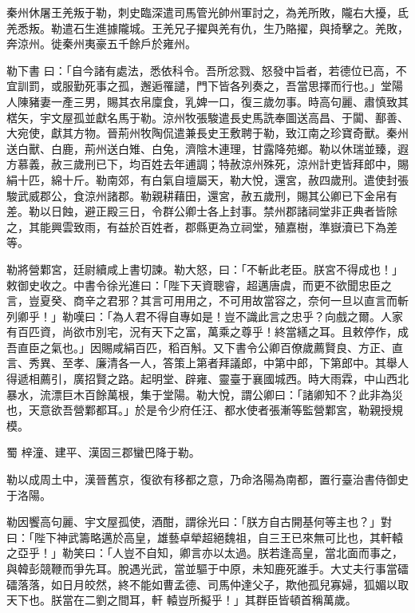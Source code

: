 \begin{pinyinscope}
 秦州休屠王羌叛于勒，刺史臨深遣司馬管光帥州軍討之，為羌所敗，隴右大擾，氐羌悉叛。勒遣石生進據隴城。王羌兄子擢與羌有仇，生乃賂擢，與掎擊之。羌敗，奔涼州。徙秦州夷豪五千餘戶於雍州。



 勒下書
 曰：「自今諸有處法，悉依科令。吾所忿戮、怒發中旨者，若德位已高，不宜訓罰，或服勤死事之孤，邂逅罹譴，門下皆各列奏之，吾當思擇而行也。」堂陽人陳豬妻一產三男，賜其衣帛廩食，乳婢一口，復三歲勿事。時高句麗、肅慎致其楛矢，宇文屋孤並獻名馬于勒。涼州牧張駿遣長史馬詵奉圖送高昌、于闐、鄯善、大宛使，獻其方物。晉荊州牧陶侃遣兼長史王敷聘于勒，致江南之珍寶奇獸。秦州送白獸、白鹿，荊州送白雉、白兔，濟陰木連理，甘露降苑鄉。勒以休瑞並臻，遐方慕義，赦三歲刑已下，均百姓去年逋調；特赦涼州殊死，涼州計吏皆拜郎中，賜
 絹十匹，綿十斤。勒南郊，有白氣自壇屬天，勒大悅，還宮，赦四歲刑。遣使封張駿武威郡公，食涼州諸郡。勒親耕藉田，還宮，赦五歲刑，賜其公卿已下金帛有差。勒以日蝕，避正殿三日，令群公卿士各上封事。禁州郡諸祠堂非正典者皆除之，其能興雲致雨，有益於百姓者，郡縣更為立祠堂，殖嘉樹，準嶽瀆已下為差等。



 勒將營鄴宮，廷尉續咸上書切諫。勒大怒，曰：「不斬此老臣。朕宮不得成也！」敕御史收之。中書令徐光進曰：「陛下天資聰睿，超邁唐虞，而更不欲聞忠臣之言，豈夏癸、商辛之君邪？其言可用用之，不可用故當容之，奈何一旦以直言而斬
 列卿乎！」勒嘆曰：「為人君不得自專如是！豈不識此言之忠乎？向戲之爾。人家有百匹資，尚欲市別宅，況有天下之富，萬乘之尊乎！終當繕之耳。且敕停作，成吾直臣之氣也。」因賜咸絹百匹，稻百斛。又下書令公卿百僚歲薦賢良、方正、直言、秀異、至孝、廉清各一人，答策上第者拜議郎，中第中郎，下第郎中。其舉人得遞相薦引，廣招賢之路。起明堂、辟雍、靈臺于襄國城西。時大雨霖，中山西北暴水，流漂巨木百餘萬根，集于堂陽。勒大悅，謂公卿曰：「諸卿知不？此非為災也，天意欲吾營鄴都耳。」於是令少府任汪、都水使者張漸等監營鄴宮，勒親授規模。



 蜀
 梓潼、建平、漢固三郡蠻巴降于勒。



 勒以成周土中，漢晉舊京，復欲有移都之意，乃命洛陽為南都，置行臺治書侍御史于洛陽。



 勒因饗高句麗、宇文屋孤使，酒酣，謂徐光曰：「朕方自古開基何等主也？」對曰：「陛下神武籌略邁於高皇，雄藝卓犖超絕魏祖，自三王已來無可比也，其軒轅之亞乎！」勒笑曰：「人豈不自知，卿言亦以太過。朕若逢高皇，當北面而事之，與韓彭競鞭而爭先耳。脫遇光武，當並驅于中原，未知鹿死誰手。大丈夫行事當礌礌落落，如日月皎然，終不能如曹孟德、司馬仲達父子，欺他孤兒寡婦，狐媚以取天下也。朕當在二劉之間耳，軒
 轅豈所擬乎！」其群臣皆頓首稱萬歲。




\end{pinyinscope}
